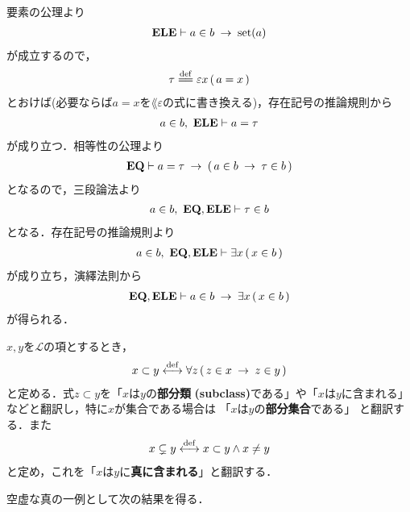 	\begin{prf}
		要素の公理より
		\begin{align}
			\mbox{{\bf ELE}} \vdash a \in b \hspace{0.25em}\rightarrow\hspace{0.25em} \operatorname*{set} (a)
		\end{align}
		が成立するので，
		\begin{align}
			\tau \defeq \varepsilon x\, (\, a = x\, )
		\end{align}
		とおけば(必要ならば$a = x$を$\lang{\varepsilon}$の式に書き換える)，存在記号の推論規則から
		\begin{align}
			a \in b,\ \mbox{{\bf ELE}} \vdash a = \tau
		\end{align}
		が成り立つ．相等性の公理より
		\begin{align}
			\mbox{{\bf EQ}} \vdash a = \tau \hspace{0.25em}\rightarrow\hspace{0.25em} (\, a \in b \hspace{0.25em}\rightarrow\hspace{0.25em} \tau \in b\, )
		\end{align}
		となるので，三段論法より
		\begin{align}
			a \in b,\ \mbox{{\bf EQ}},\mbox{{\bf ELE}} \vdash \tau \in b
		\end{align}
		となる．存在記号の推論規則より
		\begin{align}
			a \in b,\ \mbox{{\bf EQ}},\mbox{{\bf ELE}} \vdash \exists x\, (\, x \in b\, )
		\end{align}
		が成り立ち，演繹法則から
		\begin{align}
			\mbox{{\bf EQ}},\mbox{{\bf ELE}} \vdash a \in b \hspace{0.25em}\rightarrow\hspace{0.25em} \exists x\, (\, x \in b\, )
		\end{align}
		が得られる．
		\QED
	\end{prf}
	
	\begin{screen}
		\begin{dfn}[部分類]
			$x,y$を$\mathcal{L}$の項とするとき，
			\begin{align}
				x \subset y \overset{\mathrm{def}}{\longleftrightarrow}
				\forall z\, (\, z \in x \hspace{0.25em}\rightarrow\hspace{0.25em} z \in y\, )
			\end{align}
			と定める．式$z \subset y$を「$x$は$y$の{\bf 部分類}
			{\bf (subclass)}である」や「$x$は$y$に含まれる」などと翻訳し，特に$x$が集合である場合は
			「$x$は$y$の{\bf 部分集合}である」
			と翻訳する．また
			\begin{align}
				x \subsetneq y \overset{\mathrm{def}}{\longleftrightarrow} x \subset y \wedge x \neq y
			\end{align}
			と定め，これを「$x$は$y$に{\bf 真に含まれる}」と翻訳する．
		\end{dfn}
	\end{screen}
	
	空虚な真の一例として次の結果を得る．
	
